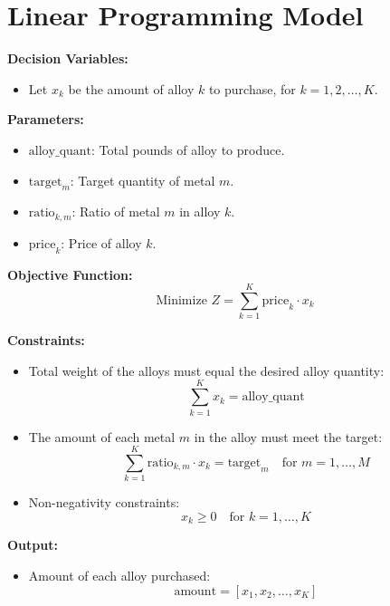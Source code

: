 \documentclass{article}
\begin{document}
\section*{Linear Programming Model}

\textbf{Decision Variables:}
\begin{itemize}
    \item Let \( x_k \) be the amount of alloy \( k \) to purchase, for \( k = 1, 2, \ldots, K \).
\end{itemize}

\textbf{Parameters:}
\begin{itemize}
    \item \( \text{alloy\_quant} \): Total pounds of alloy to produce.
    \item \( \text{target}_m \): Target quantity of metal \( m \).
    \item \( \text{ratio}_{k, m} \): Ratio of metal \( m \) in alloy \( k \).
    \item \( \text{price}_k \): Price of alloy \( k \).
\end{itemize}

\textbf{Objective Function:}
\[
\text{Minimize } Z = \sum_{k=1}^{K} \text{price}_k \cdot x_k
\]

\textbf{Constraints:}
\begin{itemize}
    \item Total weight of the alloys must equal the desired alloy quantity:
    \[
    \sum_{k=1}^{K} x_k = \text{alloy\_quant}
    \]
    \item The amount of each metal \( m \) in the alloy must meet the target:
    \[
    \sum_{k=1}^{K} \text{ratio}_{k, m} \cdot x_k = \text{target}_m \quad \text{for } m = 1, \ldots, M
    \]
    \item Non-negativity constraints:
    \[
    x_k \geq 0 \quad \text{for } k = 1, \ldots, K
    \]
\end{itemize}

\textbf{Output:}
\begin{itemize}
    \item Amount of each alloy purchased:
    \[
    \text{amount} = [x_1, x_2, \ldots, x_K]
    \]
\end{itemize}
\end{document}
